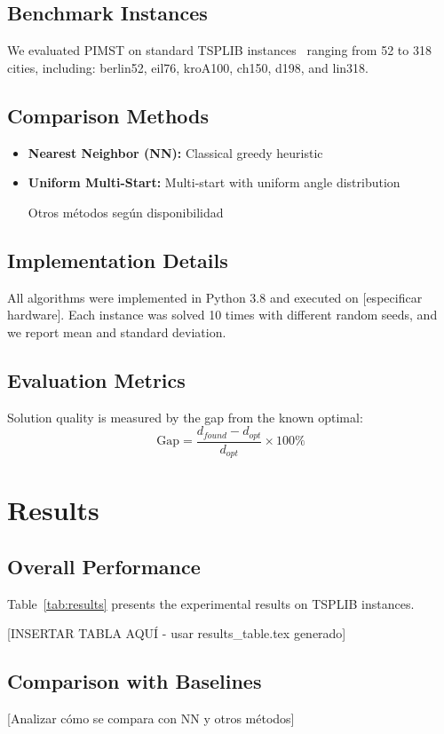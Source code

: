 \documentclass[conference]{IEEEtran}
\begin{document}
\subsection{Benchmark Instances}
We evaluated PIMST on standard TSPLIB instances~\cite{reinelt1991tsplib} ranging from 52 to 318 cities, including: berlin52, eil76, kroA100, ch150, d198, and lin318.

\subsection{Comparison Methods}
\begin{itemize}
\item \textbf{Nearest Neighbor (NN):} Classical greedy heuristic
\item \textbf{Uniform Multi-Start:} Multi-start with uniform angle distribution
\item [Otros métodos según disponibilidad]
\end{itemize}

\subsection{Implementation Details}
All algorithms were implemented in Python 3.8 and executed on [especificar hardware]. Each instance was solved 10 times with different random seeds, and we report mean and standard deviation.

\subsection{Evaluation Metrics}
Solution quality is measured by the gap from the known optimal:
\begin{equation}
\text{Gap} = \frac{d_{found} - d_{opt}}{d_{opt}} \times 100\%
\end{equation}

\section{Results}

\subsection{Overall Performance}
Table~\ref{tab:results} presents the experimental results on TSPLIB instances.

[INSERTAR TABLA AQUÍ - usar results_table.tex generado]

\subsection{Comparison with Baselines}
[Analizar cómo se compara con NN y otros métodos]
\end{document}
